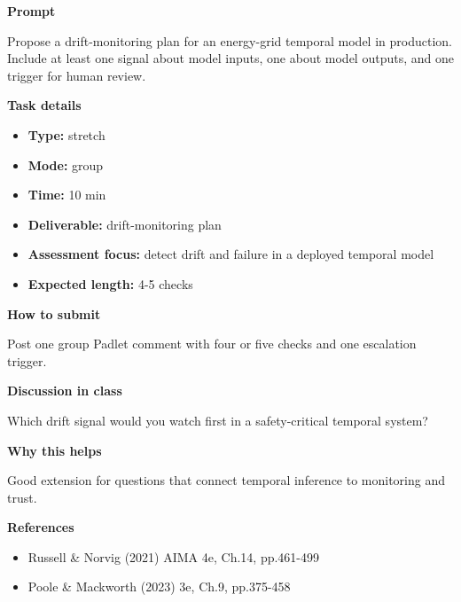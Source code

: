 \documentclass[11pt]{article}
\begin{document}
\begin{tcolorbox}[colback=white,colframe=MidnightBlue,title={Q6 Stretch Extension},fonttitle=\bfseries,breakable]
\begin{center}
\end{center}

{\large\bfseries\color{MidnightBlue} Prompt}\par\medskip
Propose a drift-monitoring plan for an energy-grid temporal model in production. Include at least one signal about model inputs, one about model outputs, and one trigger for human review.

{\large\bfseries\color{MidnightBlue} Task details}\par\medskip
\begin{itemize}\item \textbf{Type:} stretch
\item \textbf{Mode:} group
\item \textbf{Time:} 10 min
\item \textbf{Deliverable:} drift-monitoring plan
\item \textbf{Assessment focus:} detect drift and failure in a deployed temporal model
\item \textbf{Expected length:} 4-5 checks\end{itemize}

{\large\bfseries\color{MidnightBlue} How to submit}\par\medskip
Post one group Padlet comment with four or five checks and one escalation trigger.

{\large\bfseries\color{MidnightBlue} Discussion in class}\par\medskip
Which drift signal would you watch first in a safety-critical temporal system?

{\large\bfseries\color{MidnightBlue} Why this helps}\par\medskip
Good extension for questions that connect temporal inference to monitoring and trust.

{\large\bfseries\color{MidnightBlue} References}\par\medskip
\begin{itemize}\item Russell \& Norvig (2021) AIMA 4e, Ch.14, pp.461-499
\item Poole \& Mackworth (2023) 3e, Ch.9, pp.375-458\end{itemize}
\end{tcolorbox}
\end{document}
